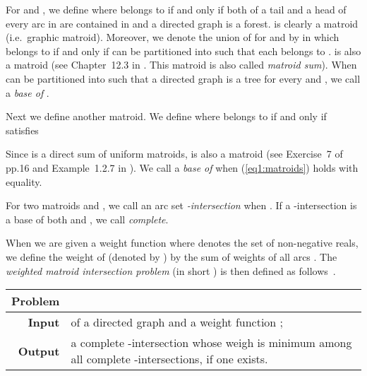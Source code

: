 \documentclass[11pt]{article}
\newcounter{ni}
\theoremstyle{plain}
\begin{document}
For  and , 
we define  
where  belongs to  
if and only if both of 
a tail and a head of every arc in  are contained in  and 
a directed graph  is a forest. 
 is clearly a matroid (i.e.~graphic matroid). 
Moreover, we denote the union of  
for  and 
by  
in which  belongs to 
if and only if  can be partitioned into  
such that each  belongs to . 
 is also a matroid
(see Chapter~12.3 in \cite{O92}. This matroid is also called {\it matroid sum}).
When  can be partitioned into 
such that a directed graph  is a tree for 
every  and , 
we call  a {\it base of }. 

Next we define another matroid. We define  
where  
belongs to  if and only if  satisfies 

Since  is a direct sum of uniform matroids,  
 is also a matroid (see Exercise~7 of pp.16 and Example~1.2.7 in \cite{O92}). 
We call  a {\it base of } 
when (\ref{eq1:matroids}) holds with equality. 

For two matroids  and , 
we call an arc set 
{\it -intersection} when . 
If a -intersection  is a base of both  and , 
we call  {\it complete}. 

When we are given a weight function  where  
denotes the set of non-negative reals, 
we define the weight of  (denoted by ) 
by the sum of weights of all arcs . 
The {\it weighted matroid intersection problem} (in short ) is then defined as follows~\cite{F81}. 
\begin{center}
\begin{tabularx}{150mm}{rX}
\hline
{\bf Problem} &  
\\
\hline 
{\bf Input} &
 of a directed graph   
and a weight function ;
\\
{\bf Output} &
a complete -intersection  whose weigh is minimum among all complete 
-intersections, if one exists.
\\
\hline
\end{tabularx}
\end{center}
\end{document}
